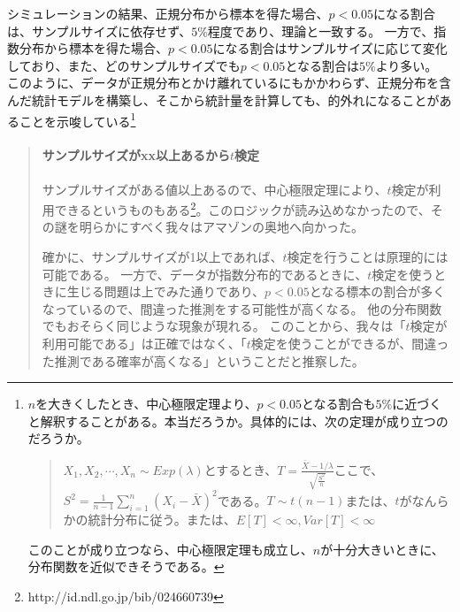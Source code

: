 シミュレーションの結果、正規分布から標本を得た場合、$p<0.05$になる割合は、サンプルサイズに依存せず、$5\%$程度であり、理論と一致する。
一方で、指数分布から標本を得た場合、$p<0.05$になる割合はサンプルサイズに応じて変化しており、また、どのサンプルサイズでも$p<0.05$となる割合は$5\%$より多い。
このように、データが正規分布とかけ離れているにもかかわらず、正規分布を含んだ統計モデルを構築し、そこから統計量を計算しても、的外れになることがあることを示唆している\footnote{$n$を大きくしたとき、中心極限定理より、$p<0.05$となる割合も$5\%$に近づくと解釈することがある。本当だろうか。具体的には、次の定理が成り立つのだろうか。
\begin{quote}
\begin{theo}
    $X_1,X_2,\cdots,X_n \sim Exp(\lambda)$とするとき、$T=\frac{\bar{X}-1/\lambda}{\sqrt{\frac{S^2}{n}}}$ここで、$S^2=\frac{1}{n-1}\sum_{i=1}^n(X_i-\bar{X})^2$である。$T\sim t(n-1)$または、$t$がなんらかの統計分布に従う。または、$E[T]<\infty,Var[T]<\infty$
\end{theo}
\end{quote}
このことが成り立つなら、中心極限定理も成立し、$n$が十分大きいときに、分布関数を近似できそうである。
}
\fi
\begin{mybox}
    \begin{quote}
        \paragraph{サンプルサイズがxx以上あるから$t$検定}
        サンプルサイズがある値以上あるので、中心極限定理により、$t$検定が利用できるというものもある\footnote{http://id.ndl.go.jp/bib/024660739}。このロジックが読み込めなかったので、その謎を明らかにすべく我々はアマゾンの奥地へ向かった。

        確かに、サンプルサイズが1以上であれば、$t$検定を行うことは原理的には可能である。
        一方で、データが指数分布的であるときに、$t$検定を使うときに生じる問題は上でみた通りであり、$p<0.05$となる標本の割合が多くなっているので、間違った推測をする可能性が高くなる。
        他の分布関数でもおそらく同じような現象が現れる。
        このことから、我々は「$t$検定が利用可能である」は正確ではなく、「$t$検定を使うことができるが、間違った推測である確率が高くなる」ということだと推察した。
    \end{quote}
\end{mybox}

